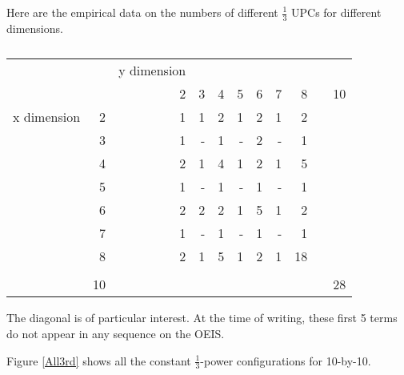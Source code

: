 \documentclass[12pt]{article}
\theoremstyle{definition}
\theoremstyle{remark}
\theoremstyle{remark}
\begin{document}
\par
Here are the empirical data on the numbers of different $\frac{1}{3}$ UPCs for different dimensions.
\begin{table}[H]
\begin{tabular}{l r | *{9}{r} }
  & & y dimension & & & & & & \\
  & & 2 & 3 & 4 & 5 & 6 & 7 & 8 & & 10\\ \hline
  x dimension & 2 & 1 & 1 & 2 & 1 & 2 & 1 & 2 \\
  & 3 & 1 & - & 1 & - & 2 & - & 1 \\
  & 4 & 2 & 1 & 4 & 1 & 2 & 1 & 5 \\
  & 5 & 1 & - & 1 & - & 1 & - & 1 \\
  & 6 & 2 & 2 & 2 & 1 & 5 & 1 & 2 \\
  & 7 & 1 & - & 1 & - & 1 & - & 1 \\
  & 8 & 2 & 1 & 5 & 1 & 2 & 1 & 18 \\
  & \\
& 10 & & & & & & & & & 28 \\
\end{tabular}
\caption{}
\end{table}
The diagonal is of particular interest. At the time of writing, these first 5 terms do not appear in any sequence on the OEIS. \\

\par Figure \ref{All3rd} shows all the constant $\frac{1}{3}$-power configurations for 10-by-10. 
\end{document}
